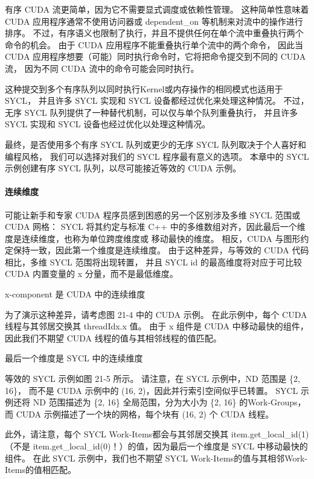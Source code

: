 有序 CUDA 流更简单，因为它不需要显式调度或依赖性管理。 
这种简单性意味着 CUDA 应用程序通常不使用访问器或 dependent\_on 等机制来对流中的操作进行排序。 
不过，有序语义也限制了执行，并且不提供任何在单个流中重叠执行两个命令的机会。 
由于 CUDA 应用程序不能重叠执行单个流中的两个命令，
因此当 CUDA 应用程序想要（可能）同时执行命令时，它将把命令提交到不同的 CUDA 流，
因为不同 CUDA 流中的命令可能会同时执行。

这种提交到多个有序队列以同时执行Kernel或内存操作的相同模式也适用于 SYCL，
并且许多 SYCL 实现和 SYCL 设备都经过优化来处理这种情况。 
不过，无序 SYCL 队列提供了一种替代机制，可以仅与单个队列重叠执行，
并且许多 SYCL 实现和 SYCL 设备也经过优化以处理这种情况。

最终，是否使用多个有序 SYCL 队列或更少的无序 SYCL 队列取决于个人喜好和编程风格，
我们可以选择对我们的 SYCL 程序最有意义的选项。 
本章中的 SYCL 示例创建有序 SYCL 队列，以尽可能接近等效的 CUDA 示例。

\paragraph{连续维度}

可能让新手和专家 CUDA 程序员感到困惑的另一个区别涉及多维 SYCL 范围或 CUDA 网格：
SYCL 将其约定与标准 C++ 中的多维数组对齐，因此最后一个维度是连续维度，也称为单位跨度维度或 移动最快的维度。 
相反，CUDA 与图形约定保持一致，因此第一个维度是连续维度。 
由于这种差异，与等效的 CUDA 代码相比，多维 SYCL 范围将出现转置，
并且 SYCL id 的最高维度将对应于可比较 CUDA 内置变量的 x 分量，而不是最低维度。

{\color{red} x-component 是 CUDA 中的连续维度}

为了演示这种差异，请考虑图 21-4 中的 CUDA 示例。 
在此示例中，每个 CUDA 线程与其邻居交换其 threadIdx.x 值。 
由于 x 组件是 CUDA 中移动最快的组件，因此我们不期望 CUDA 线程的值与其相邻线程的值匹配。

{\color{red} 最后一个维度是 SYCL 中的连续维度}

等效的 SYCL 示例如图 21-5 所示。 请注意，在 SYCL 示例中，ND 范围是 \{2, 16\}，
而不是 CUDA 示例中的 (16, 2)，因此并行索引空间似乎已转置。 
SYCL 示例还将 ND 范围描述为 \{2, 16\} 全局范围，分为大小为 \{2, 16\} 的Work-Groups，
而 CUDA 示例描述了一个块的网格，每个块有 (16, 2) 个 CUDA 线程。

此外，请注意，每个 SYCL Work-Items都会与其邻居交换其 item.get\_local\_id(1)
（不是 item.get\_local\_id(0)！）的值，因为最后一个维度是 SYCL 中移动最快的组件。 
在此 SYCL 示例中，我们也不期望 SYCL Work-Items的值与其相邻Work-Items的值相匹配。

